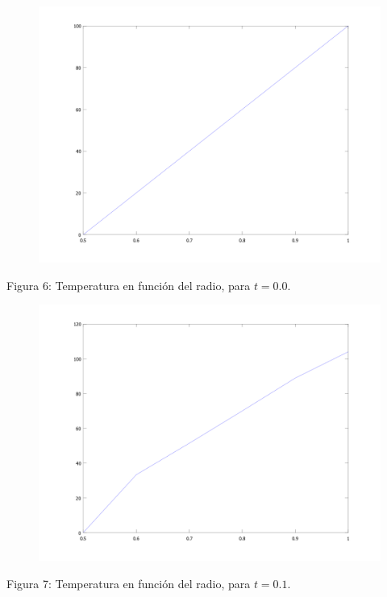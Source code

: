﻿\documentclass[%
final,
%
reprint,
%
notitlepage,
narroweqnarray,
inline,
twoside,
invited
]{ieee}
\begin{document}
\begin{figure}[H]
	\begin{center}
	\includegraphics[scale=0.2]{./img/div1.png}
	\end{center}
\end{figure}
\begin{center}
\par Figura 6: Temperatura en función del radio, para $t=0.0$.
\end{center}

\begin{figure}[H]
	\begin{center}
	\includegraphics[scale=0.2]{./img/div2.png}
	\end{center}
\end{figure}
\begin{center}
\par Figura 7: Temperatura en función del radio, para $t=0.1$.
\end{center}
\end{document}
